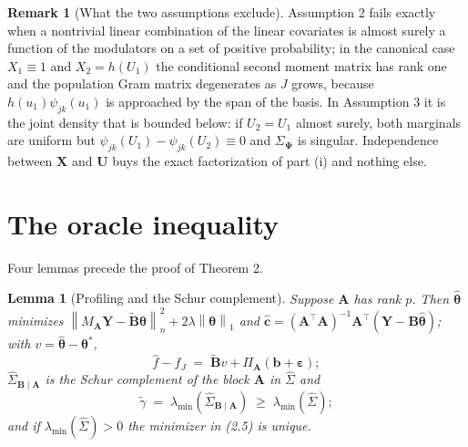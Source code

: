 \documentclass[10pt]{book}
\newtheorem{lemma}{Lemma}[section]
\theoremstyle{definition}
\newtheorem{remark}{Remark}[section]
\newcommand{\T}{^{\top}}
\newcommand{\norm}[1]{\left\lVert #1 \right\rVert}
\newcommand{\normn}[1]{\left\lVert #1 \right\rVert_{n}}
\newcommand{\lev}{j}
\newcommand{\tsl}{k}
\newcommand{\bX}{\mathbf{X}}
\newcommand{\bU}{\mathbf{U}}
\newcommand{\wav}[2]{\psi_{#1#2}}
\newcommand{\btheta}{\boldsymbol{\theta}}
\newcommand{\thetastar}{\btheta^{*}}
\newcommand{\thetahat}{\widehat{\btheta}}
\newcommand{\chat}{\widehat{\mathbf{c}}}
\newcommand{\Gram}{\Sigma}
\newcommand{\Gramhat}{\widehat{\Sigma}}
\newcommand{\pen}{\lambda}
\newcommand{\Amat}{\mathbf{A}}
\newcommand{\Bmat}{\mathbf{B}}
\newcommand{\Btil}{\widetilde{\Bmat}}
\newcommand{\PA}{\Pi_{\Amat}}
\newcommand{\MA}{M_{\Amat}}
\newcommand{\bveps}{\boldsymbol{\varepsilon}}
\newcommand{\bb}{\mathbf{b}}
\newcommand{\bY}{\mathbf{Y}}
\newcommand{\bPsi}{\boldsymbol{\Psi}}
\newcommand{\gtil}{\widetilde{\gamma}}
\newcommand{\lmin}{\lambda_{\min}}
\newcommand{\GBA}{\Gramhat_{\Bmat\mid\Amat}}
\begin{document}
\begin{remark}[What the two assumptions exclude]
\label{rem:excl}
Assumption 2 fails exactly when a nontrivial linear combination of the linear
covariates is almost surely a function of the modulators on a set of positive
probability; in the canonical case $X_1\equiv1$ and $X_2 = h(U_1)$ the
conditional second moment matrix has rank one and the population Gram matrix
degenerates as $J$ grows, because $h(u_1)\wav{\lev}{\tsl}(u_1)$ is approached
by the span of the basis. In Assumption 3 it is the joint density that is
bounded below: if $U_2 = U_1$ almost surely, both marginals are uniform but
$\wav{\lev}{\tsl}(U_1)-\wav{\lev}{\tsl}(U_2) \equiv 0$ and
$\Gram_{\bPsi}$ is singular. Independence between $\bX$ and $\bU$ buys the
exact factorization of part (i) and nothing else.
\end{remark}

\section{The oracle inequality}
\setcounter{equation}{0}

Four lemmas precede the proof of Theorem 2.

\begin{lemma}[Profiling and the Schur complement]
\label{lem:profile}
Suppose $\Amat$ has rank $p$. Then $\thetahat$ minimizes
$\normn{\MA\bY-\Btil\btheta}^2+2\pen\norm{\btheta}_1$ and
$\chat = (\Amat\T\Amat)^{-1}\Amat\T(\bY-\Bmat\thetahat)$; with
$v = \thetahat-\thetastar$,
\begin{equation}
  \label{eq:decomp}
  \widehat{f}-f_J \;=\; \Btil v + \PA(\bb+\bveps);
\end{equation}
$\GBA$ is the Schur complement of the block $\Amat$ in $\Gramhat$ and
\begin{equation}
  \label{eq:schur}
  \gtil \;=\; \lmin(\GBA) \;\ge\; \lmin(\Gramhat);
\end{equation}
and if $\lmin(\Gramhat)>0$ the minimizer in (2.5) is unique.
\end{lemma}
\end{document}
